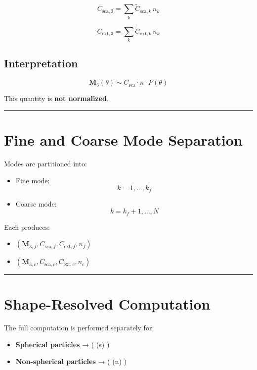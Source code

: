 \documentclass[
  letterpaper,
]{scrbook}
\providecommand{\tightlist}{%
  \setlength{\itemsep}{0pt}\setlength{\parskip}{0pt}}
\begin{document}
\[
C_{\text{sca},3} = \sum_k \tilde{C}_{\text{sca},k} \, n_k
\]

\[
C_{\text{ext},3} = \sum_k \tilde{C}_{\text{ext},k} \, n_k
\]

\subsection{Interpretation}\label{interpretation-3}

\[
\mathbf{M}_3(\theta)
\sim C_{\text{sca}} \cdot n \cdot P(\theta)
\]

This quantity is \textbf{not normalized}.

\begin{center}\rule{0.5\linewidth}{0.5pt}\end{center}

\section{Fine and Coarse Mode
Separation}\label{fine-and-coarse-mode-separation}

Modes are partitioned into:

\begin{itemize}
\tightlist
\item
  Fine mode: \[
  k = 1, \dots, k_f
  \]
\item
  Coarse mode: \[
  k = k_f+1, \dots, N
  \]
\end{itemize}

Each produces:

\begin{itemize}
\tightlist
\item
  \((\mathbf{M}_{3,f}, C_{\text{sca},f}, C_{\text{ext},f}, n_f)\)
\item
  \((\mathbf{M}_{3,c}, C_{\text{sca},c}, C_{\text{ext},c}, n_c)\)
\end{itemize}

\begin{center}\rule{0.5\linewidth}{0.5pt}\end{center}

\section{Shape-Resolved Computation}\label{shape-resolved-computation}

The full computation is performed separately for:

\begin{itemize}
\tightlist
\item
  \textbf{Spherical particles} → ( (s) )\\
\item
  \textbf{Non-spherical particles} → ( (n) )
\end{itemize}
\end{document}
